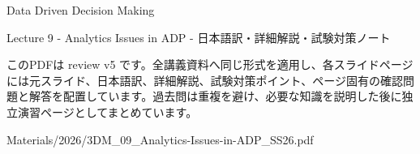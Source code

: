 \documentclass[a4paper,landscape,9pt]{article}
\begin{document}
\begin{titlepage}
\centering
\vspace*{2cm}
{\Huge Data Driven Decision Making\par}
\vspace{0.5cm}
{\Large Lecture 9 - Analytics Issues in ADP - 日本語訳・詳細解説・試験対策ノート\par}
\vspace{1cm}
\begin{minipage}{0.82\textwidth}
このPDFは review v5 です。全講義資料へ同じ形式を適用し、各スライドページには元スライド、日本語訳、詳細解説、試験対策ポイント、ページ固有の確認問題と解答を配置しています。過去問は重複を避け、必要な知識を説明した後に独立演習ページとしてまとめています。
\end{minipage}
\vfill
{\large Materials/2026/3DM\_09\_Analytics-Issues-in-ADP\_SS26.pdf}
\end{titlepage}
\tableofcontents
\clearpage

\end{document}
